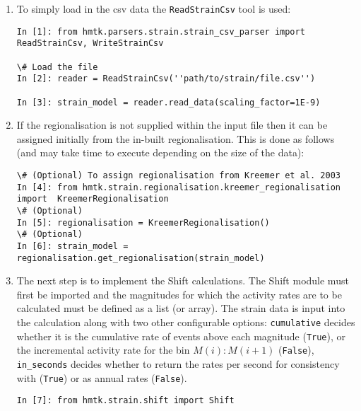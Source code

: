 \begin{enumerate}

\item To simply load in the csv data the \verb=ReadStrainCsv= tool is used:

\begin{Verbatim}[frame=single, commandchars=\\\{\}, fontsize=\scriptsize]
In [1]: from hmtk.parsers.strain.strain_csv_parser import ReadStrainCsv, WriteStrainCsv

\# Load the file
In [2]: reader = ReadStrainCsv(''path/to/strain/file.csv'')

In [3]: strain_model = reader.read_data(scaling_factor=1E-9)

\end{Verbatim}

\item If the regionalisation is not supplied within the input file then it can be assigned initially from the in-built \cite{Kreemer_etal2003} regionalisation. This is done as follows (and may take time to execute depending on the size of the data):

\begin{Verbatim}[frame=single, commandchars=\\\{\}, fontsize=\scriptsize]
\# (Optional) To assign regionalisation from Kreemer et al. 2003
In [4]: from hmtk.strain.regionalisation.kreemer_regionalisation import  KreemerRegionalisation
\# (Optional)
In [5]: regionalisation = KreemerRegionalisation()
\# (Optional)
In [6]: strain_model = regionalisation.get_regionalisation(strain_model)
\end{Verbatim}

\item The next step is to implement the Shift calculations. The Shift module must first be imported and the magnitudes for which the activity rates are to be calculated must be defined as a list (or array). The strain data is input into the calculation along with two other configurable options: \verb=cumulative= decides whether it is the cumulative rate of events above each magnitude (\verb=True=), or the incremental activity rate for the bin $M \left( i \right):M \left( {i + 1} \right)$ (\verb=False=), \verb=in_seconds= decides whether to return the rates per second for consistency with \cite{Bird_etal2010} (\verb=True=) or as annual rates (\verb=False=). 

\begin{Verbatim}[frame=single, commandchars=\\\{\}, fontsize=\scriptsize]
In [7]: from hmtk.strain.shift import Shift


\end{Verbatim}
\end{enumerate}
